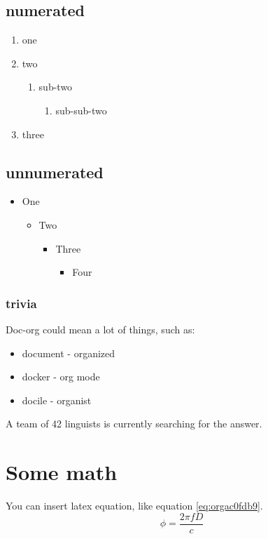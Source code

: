 \subsection{numerated}
\label{sec:orgf3dc028}
\begin{enumerate}
\item one
\item two
\begin{enumerate}
\item sub-two
\begin{enumerate}
\item sub-sub-two
\end{enumerate}
\end{enumerate}
\item three
\end{enumerate}

\subsection{unnumerated}
\label{sec:orgec39bb1}
\begin{itemize}
\item One
\begin{itemize}
\item Two
\begin{itemize}
\item Three
\begin{itemize}
\item Four
\end{itemize}
\end{itemize}
\end{itemize}
\end{itemize}

\subsubsection{trivia}
\label{sec:org95759fe}
Doc-org could mean a lot of things, such as:
\begin{itemize}
\item document - organized
\item docker - org mode
\item docile - organist
\end{itemize}
A team of 42 linguists is currently searching for the answer.

\section{Some math}
\label{sec:org04031b9}
You can insert latex equation, like equation \ref{eq:orgac0fdb9}.
\begin{equation}
\label{eq:orgac0fdb9}
\phi = \frac{2\pi fD}{c}
\end{equation}

